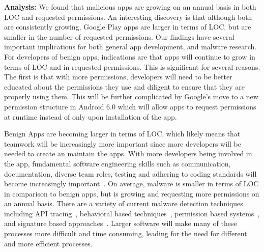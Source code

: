 \documentclass{sig-alternate-05-2015}
\begin{document}
\noindent
\textbf{Analysis:} We found that malicious apps are growing on an annual basis in both LOC and requested permissions. An interesting discovery is that although both are consistently growing, Google Play apps are larger in terms of LOC, but are smaller in the number of requested permissions. Our findings have several important implications for both general app development, and malware research. For developers of benign apps, indications are that apps will continue to grow in terms of LOC and in requested permissions. This is significant for several reasons. The first is that with more permissions, developers will need to be better educated about the permissions they use and diligent to ensure that they are properly using them. This will be further complicated by Google's move to a new permission structure in Android 6.0 which will allow apps to request permissions at runtime instead of only upon installation of the app.

Benign Apps are becoming larger in terms of LOC, which likely means that teamwork will be increasingly more important since more developers will be needed to create an maintain the apps. With more developers being involved in the app, fundamental software engineering skills such as communication, documentation, diverse team roles, testing and adhering to coding standards will become increasingly important~\cite{Pressman:2009:SEP:1593949}. On average, malware is smaller in terms of LOC in comparison to benign apps, but is growing and requesting more permissions on an annual basis. There are a variety of current malware detection techniques including API tracing~\cite{6298136}, behavioral based techniques~\cite{burguera2011crowdroid, shabtai2012andromaly}, permission based systems~\cite{talha2015apk}, and signature based approaches~\cite{Feng:2014:ASD:2635868.2635869}. Larger software will make many of these processes more difficult and time consuming, leading for the need for different and more efficient processes.
\end{document}
